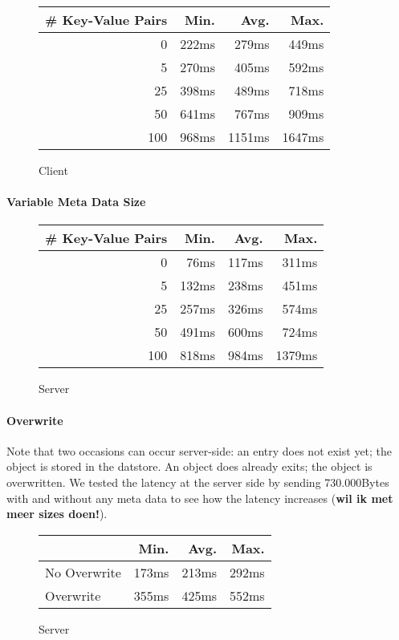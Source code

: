 \begin{figure}
\begin{tabular}{|r|r|r|r|}
\hline
\# Key-Value Pairs & Min. & Avg. & Max. \\
\hline
0 & 222ms & 279ms & 449ms \\
5 & 270ms & 405ms & 592ms \\
25 & 398ms & 489ms & 718ms\\
50 &  641ms & 767ms & 909ms \\
100 & 968ms & 1151ms & 1647ms\\
\hline
\end{tabular}
\caption{Client}
\end{figure}
\paragraph{Variable Meta Data Size}

\begin{figure}
\begin{tabular}{|r|r|r|r|}
\hline
# Key-Value Pairs & Min. & Avg. & Max. \\
\hline
0 & 76ms & 117ms & 311ms \\
5 & 132ms & 238ms & 451ms \\
25 & 257ms & 326ms & 574ms \\
50 & 491ms & 600ms & 724ms \\
100 & 818ms & 984ms & 1379ms \\
\hline
\end{tabular}
\caption{Server}
\end{figure}

\paragraph{Overwrite}
Note that two occasions can occur server-side: an entry does not exist yet; the
object is stored in the datstore. An object does already exits; the object is
overwritten. We tested the latency at the server side by sending 730.000Bytes
with and without any meta data to see how the latency increases (\textbf{wil ik
met meer sizes doen!}).

\begin{figure}
\begin{tabular}{|l|r|r|r|}
\hline
 & Min. & Avg. & Max. \\
\hline
No Overwrite & 173ms & 213ms & 292ms \\
Overwrite & 355ms & 425ms & 552ms \\
\hline
\end{tabular}
\caption{Server}
\end{figure}

